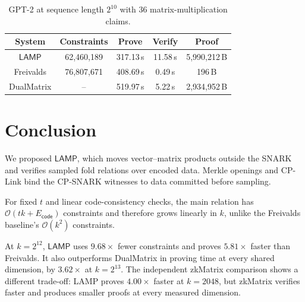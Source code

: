\documentclass[conference,compsoc]{IEEEtran}
\makeatletter
\newif\ifshowrevisions
\newenvironment{revblock}[1][]
  {%
    \ifshowrevisions
      \begin{tcolorbox}[
        breakable,
        colback=revisionyellow,
        colframe=revisionyellow,
        boxrule=0pt,
        arc=0pt,
        left=2pt,
        right=2pt,
        top=2pt,
        bottom=2pt,
        before skip=2pt,
        after skip=2pt,
        #1
      ]
    \fi
  }
  {%
    \ifshowrevisions
      \end{tcolorbox}
    \fi
  }
\newcommand{\protocol}{\textsf{LAMP}}   %
\theoremstyle{plain}
\theoremstyle{definition}
\theoremstyle{remark}
\providecommand{\DIFaddtex}[1]{{\protect\color{blue}\uwave{#1}}} %
\providecommand{\DIFdeltex}[1]{{\protect\color{red}\sout{#1}}} %
\providecommand{\DIFaddbegin}{} %
\providecommand{\DIFaddend}{} %
\providecommand{\DIFdelbegin}{} %
\providecommand{\DIFdelend}{} %
\providecommand{\DIFadd}[1]{\texorpdfstring{\DIFaddtex{#1}}{#1}} %
\providecommand{\DIFdel}[1]{\texorpdfstring{\DIFdeltex{#1}}{}} %
\let\sout@orig\sout %
\renewcommand{\sout}[1]{\ifmmode\text{\sout@orig{\ensuremath{#1}}}\else\sout@orig{#1}\fi} %
\renewcommand{\DIFaddtex}[1]{{\protect\color{DiffBlue}#1}}
\renewcommand{\DIFdeltex}[1]{}
\makeatother
\begin{document}
\begin{table}[H]
\centering
\ifshowrevisions
  \rowcolors{1}{yellow!20}{yellow!20}
\fi
\setlength{\tabcolsep}{3pt}
\begin{tabular*}{\columnwidth}{@{\extracolsep{\fill}}ccccc@{}}
\toprule
\textbf{System} & \textbf{Constraints} & \textbf{Prove} & \textbf{Verify} & \textbf{Proof} \\
\midrule
\(\protocol\) & 62{,}460{,}189 & 317.13\,s & 11.58\,s & 5{,}990{,}212\,B \\
Freivalds & 76{,}807{,}671 & 408.69\,s & 0.49\,s & 196\,B \\
DualMatrix & -- & 519.97\,s & 5.22\,s & 2{,}934{,}952\,B \\
\bottomrule
\end{tabular*}
\vspace{6pt}
\caption{GPT-2 at sequence length \(2^{10}\) with 36 matrix-multiplication
claims.}
\label{tab:lamp-gpt2}
\end{table}




\section{Conclusion}
  \label{sec:conclusion}

  We proposed \(\protocol\), which moves vector--matrix products outside the
  SNARK and verifies sampled fold relations over encoded data. Merkle openings
  and CP-Link bind the CP-SNARK witnesses to data committed before sampling.

  For fixed \(t\) and linear code-consistency checks, the main relation has
  \(\mathcal{O}(tk+E_{\mathsf{code}})\) constraints and therefore grows linearly
  in \(k\), unlike the Freivalds baseline's \(\mathcal{O}(k^2)\) constraints.

  \begin{revblock}
  At \(k=2^{12}\), \(\protocol\) \DIFdelbegin \DIFdel{reduces the Freivalds baseline's constraints
  from \(50{,}495{,}818\) to }%
\DIFdel{(}\DIFdelend \DIFaddbegin \DIFadd{uses }\DIFaddend \(9.68\times\) \DIFdelbegin \DIFdel{) and proving time
  from \(411.28\) s to }%
\DIFdel{s (}%
\DIFdel{)}\DIFdelend \DIFaddbegin \DIFadd{fewer constraints and proves
  \(5.81\times\) faster than Freivalds}\DIFaddend . It also outperforms
  DualMatrix in proving time at every shared dimension, by \ensuremath{3.62\times} at
  \(k=2^{13}\).
  \DIFaddbegin \DIFadd{The independent zkMatrix comparison shows a different trade-off: LAMP
  proves \(4.00\times\) faster at \(k=2048\), but zkMatrix verifies faster and
  produces smaller proofs at every measured dimension.
  }\DIFaddend \end{revblock}
\end{document}
